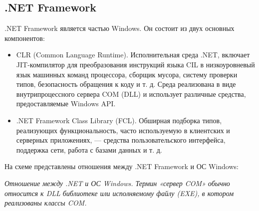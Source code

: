 \documentclass[14pt, a4paper]{article}
\begin{document}
\begin{centering}
    \subsection*{.NET Framework}
\end{centering}

.NET Framework является частью Windows. Он состоит из двух основных компонентов:
\begin{itemize}
    \item CLR (Common Language Runtime). Исполнительная среда .NET, включает JIT-компилятор
    для преобразования инструкций языка CIL в низкоуровневый язык машинных команд процессора,
    сборщик мусора, систему проверки типов, безопасность обращения к коду и т. д.
    Среда реализована в виде внутрипроцессного сервера COM (DLL) и использует различные средства,
    предоставляемые Windows API.
    \item .NET Framework Class Library (FCL). Обширная подборка типов, реализующих функциональность,
    часто используемую в клиентских и серверных приложениях, — средства пользовательского интерфейса,
    поддержка сети, работа с базами данных и т. д.
\end{itemize}


На схеме представлены отношения между .NET Framework и ОС Windows:
\begin{figure}[h]%
    \centering
    \label{framework} %
\end{figure} \newpage


\textit{Отношение между .NET и ОС Windows. Термин «сервер COM» обычно относится к DLL библиотеке или
исполняемому файлу (EXE), в котором реализованы классы COM.}
\end{document}
